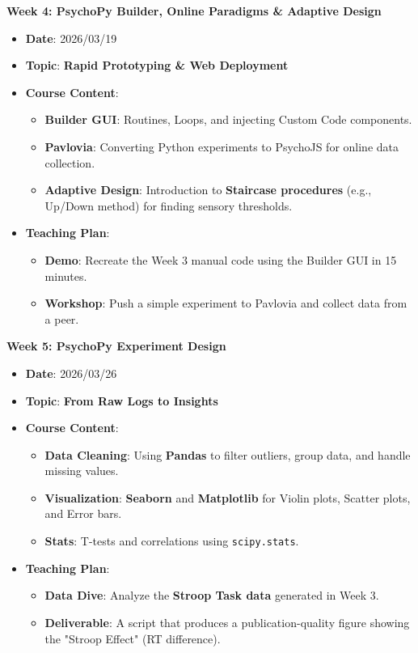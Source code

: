 \noindent\textbf{Week 4: PsychoPy Builder, Online Paradigms \& Adaptive Design}
\begin{itemize}
    \item \textbf{Date}: 2026/03/19
    \item \textbf{Topic}: \textbf{Rapid Prototyping \& Web Deployment}
    \item \textbf{Course Content}:
    \begin{itemize}
        \item \textbf{Builder GUI}: Routines, Loops, and injecting Custom Code components.
        \item \textbf{Pavlovia}: Converting Python experiments to PsychoJS for online data collection.
        \item \textbf{Adaptive Design}: Introduction to \textbf{Staircase procedures} (e.g., Up/Down method) for finding sensory thresholds.
    \end{itemize}
    \item \textbf{Teaching Plan}:
    \begin{itemize}
        \item \textbf{Demo}: Recreate the Week 3 manual code using the Builder GUI in 15 minutes.
        \item \textbf{Workshop}: Push a simple experiment to Pavlovia and collect data from a peer.
    \end{itemize}
\end{itemize}

\noindent\textbf{Week 5: PsychoPy Experiment Design}
\begin{itemize}
    \item \textbf{Date}: 2026/03/26
    \item \textbf{Topic}: \textbf{From Raw Logs to Insights}
    \item \textbf{Course Content}:
    \begin{itemize}
        \item \textbf{Data Cleaning}: Using \textbf{Pandas} to filter outliers, group data, and handle missing values.
        \item \textbf{Visualization}: \textbf{Seaborn} and \textbf{Matplotlib} for Violin plots, Scatter plots, and Error bars.
        \item \textbf{Stats}: T-tests and correlations using \texttt{scipy.stats}.
    \end{itemize}
    \item \textbf{Teaching Plan}:
    \begin{itemize}
        \item \textbf{Data Dive}: Analyze the \textbf{Stroop Task data} generated in Week 3.
        \item \textbf{Deliverable}: A script that produces a publication-quality figure showing the "Stroop Effect" (RT difference).
    \end{itemize}
\end{itemize}

